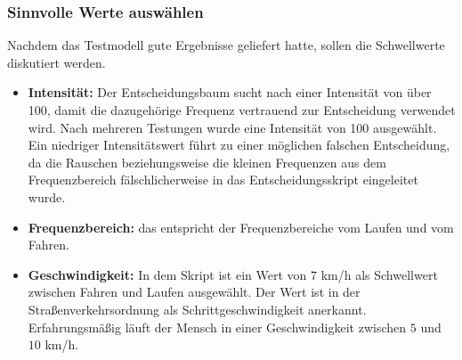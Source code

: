 %
%




\subsubsection{Sinnvolle Werte auswählen}
Nachdem das Testmodell gute Ergebnisse geliefert hatte, sollen die Schwellwerte diskutiert werden.
\begin{itemize}
	\item \textbf{Intensität:} Der Entscheidungsbaum sucht nach einer Intensität von über 100, damit die dazugehörige Frequenz vertrauend zur Entscheidung verwendet wird. Nach mehreren Testungen wurde eine Intensität von 100 ausgewählt. Ein niedriger Intensitätswert führt zu einer möglichen falschen Entscheidung, da die Rauschen beziehungsweise die kleinen Frequenzen aus dem Frequenzbereich fälschlicherweise in das Entscheidungsskript eingeleitet wurde.
	\item \textbf{Frequenzbereich:} das entspricht der Frequenzbereiche vom Laufen und vom Fahren.
	\item \textbf{Geschwindigkeit:} In dem Skript ist ein Wert von $7$ km/h als Schwellwert zwischen Fahren und Laufen ausgewählt. Der Wert ist in der Straßenverkehrsordnung als Schrittgeschwindigkeit anerkannt\citep{Bussgeldkataloge2022}. Erfahrungsmäßig läuft der Mensch in einer Geschwindigkeit zwischen $5$ und $10$ km/h.
\end{itemize}



